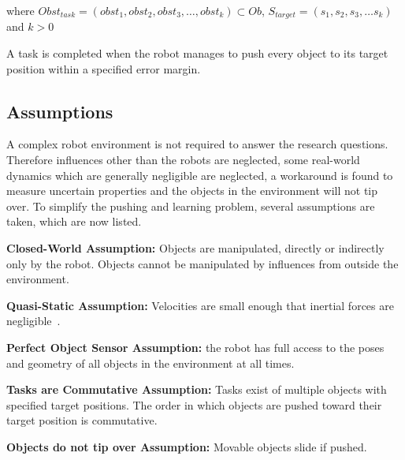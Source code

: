 where $Obst_{task} = (obst_1, obst_2, obst_3, \dots, obst_k) \subset Ob$, $S_{target} = (s_1, s_2, s_3, \dots s_k)$ and $k>0$\bs

A task is completed when the robot manages to push every object to its target position within a specified error margin. 

\subsection{Assumptions}%
\label{subsec:assumptions}
A complex robot environment is not required to answer the research questions. Therefore influences other than the robots are neglected, some real-world dynamics which are generally negligible are neglected, a workaround is found to measure uncertain properties and the objects in the environment will not tip over. To simplify the pushing and learning problem, several assumptions are taken, which are now listed.\bs

\begin{assumption*}%
\label{assumption:closed_world}
\textbf{Closed-World Assumption:} Objects are manipulated, directly or indirectly only by the robot. Objects cannot be manipulated by influences from outside the environment.
\end{assumption*}\bs

\begin{assumption*}%
\label{assumption:quasi_static}
\textbf{Quasi-Static Assumption:} Velocities are small enough that inertial forces are negligible~\cite{stuber_let_2020}.
\end{assumption*}\bs

\begin{assumption*}%
\label{assumption:perfect_object_sensor}
\textbf{Perfect Object Sensor Assumption:} the robot has full access to the poses and geometry of all objects in the environment at all times.
\end{assumption*}\bs

\begin{assumption*}%
\label{assumption:order_does_not_matter}
\textbf{Tasks are Commutative Assumption:} Tasks exist of multiple objects with specified target positions. The order in which objects are pushed toward their target position is commutative.
\end{assumption*}\bs

\begin{assumption*}%
\label{assumption:no_tipping}
\textbf{Objects do not tip over Assumption:} Movable objects slide if pushed.
\end{assumption*}\bs

